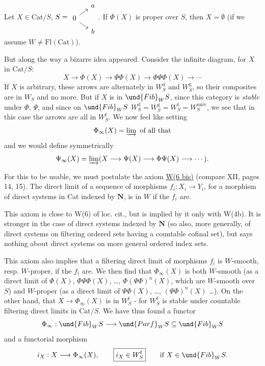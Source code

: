 
\noindent\llap{$|||$\quad}Let $X \in \mathrm{Cat}/S$, $S = \begin{tikzcd}[row sep=tiny, column sep=small] & a \\ 0 \arrow[ur] \arrow[dr] & \\ & b \end{tikzcd}$. If $\Phi(X)$ is proper over $S$, then $X = \emptyset$ (if we assume $W \neq \mathrm{Fl}(\mathrm{Cat})$).

But along the way a bizarre idea appeared. Consider the infinite diagram, for $X$ in $\mathrm{Cat}/S$:
\[
X \longrightarrow \Phi(X) \longrightarrow \Psi\Phi(X) \longrightarrow \Phi\Psi\Phi(X) \longrightarrow \cdots
\]
If $X$ is arbitrary, these arrows are alternately in $W_S^{\mathrm{d}}$ and $W_S^{\mathrm{g}}$, so their composites are in $W_S$ and no more. But if $X$ is in $\und{Fib}_W S$, since this category is \textit{stable} under $\Phi$, $\Psi$, and since on $\und{Fib}_W S$ $W_S^{\mathrm{d}} = W_S^{\mathrm{g}} = W_S^{\mathrm{f}} = W_S^{\mathrm{univ}}$, we see that in this case the arrows are all in $W_S^{\mathrm{f}}$. We now feel like setting
\[
\Phi_\infty(X) = \varinjlim \text{ of all that}
\]
and we would define symmetrically
\[
\Psi_\infty(X) = \varinjlim (X \longrightarrow \Psi(X) \longrightarrow \Phi\Psi(X) \longrightarrow \cdots).
\]

For this to be usable, we must postulate the axiom \underline{W(6 bis)} (compare XII, pages 14, 15). The direct limit of a sequence of morphisms $f_i : X_i \longrightarrow Y_i$, for a morphism of direct systems in Cat indexed by $\mathbf{N}$, is in $W$ if the $f_i$ are.

This axiom is close to W(6) of loc. cit., but is implied by it only with W(4b). It is stronger in the case of direct systems indexed by $\mathbf{N}$ (so also, more generally, of direct systems on filtering ordered sets having a countable cofinal set), but says nothing about direct systems on more general ordered index sets.

This axiom also implies that a filtering direct limit of morphisms $f_i$ is $W$-smooth, resp. $W$-proper, if the $f_i$ are. We then find that $\Phi_\infty(X)$ is both $W$-smooth (as a direct limit of $\Phi(X)$, $\Phi\Psi\Phi(X)$, \ldots, $\Phi(\Psi\Phi)^n(X)$, which are $W$-smooth over $S$) and $W$-proper (as a direct limit of $\Psi\Phi(X)$, \ldots, $(\Psi\Phi)^n(X)$ \ldots). On the other hand, that $X \longrightarrow \Phi_\infty(X)$ is in $W_S^{\mathrm{f}}$ - for $W_S^{\mathrm{f}}$ is stable under countable filtering direct limits in $\mathrm{Cat}/S$. We have thus found a functor
\[
\Phi_\infty : \und{Fib}_W S \longrightarrow \und{Parf}_W S \subseteq \und{Fib}_W S
\]
and a functorial morphism
\[
i_X : X \longrightarrow \Phi_\infty(X), \qquad \boxed{i_X \in W_S^{\mathrm{f}}} \qquad \text{if } X \in \und{Fib}_W S.
\]

